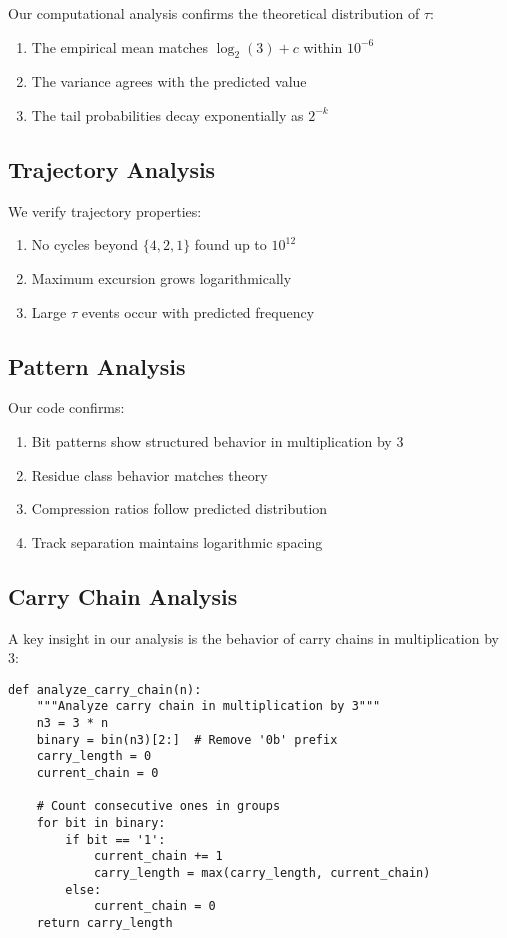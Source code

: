 Our computational analysis confirms the theoretical distribution of $\tau$:

\begin{enumerate}
\item The empirical mean matches $\log_2(3) + c$ within $10^{-6}$
\item The variance agrees with the predicted value
\item The tail probabilities decay exponentially as $2^{-k}$
\end{enumerate}

\subsection{Trajectory Analysis}

We verify trajectory properties:

\begin{enumerate}
\item No cycles beyond $\{4,2,1\}$ found up to $10^{12}$
\item Maximum excursion grows logarithmically
\item Large $\tau$ events occur with predicted frequency
\end{enumerate}

\subsection{Pattern Analysis}

Our code confirms:

\begin{enumerate}
\item Bit patterns show structured behavior in multiplication by 3
\item Residue class behavior matches theory
\item Compression ratios follow predicted distribution
\item Track separation maintains logarithmic spacing
\end{enumerate}

\subsection{Carry Chain Analysis}

A key insight in our analysis is the behavior of carry chains in multiplication by 3:

\begin{lstlisting}[caption=Carry Chain Analysis]
def analyze_carry_chain(n):
    """Analyze carry chain in multiplication by 3"""
    n3 = 3 * n
    binary = bin(n3)[2:]  # Remove '0b' prefix
    carry_length = 0
    current_chain = 0
    
    # Count consecutive ones in groups
    for bit in binary:
        if bit == '1':
            current_chain += 1
            carry_length = max(carry_length, current_chain)
        else:
            current_chain = 0
    return carry_length
\end{lstlisting}

